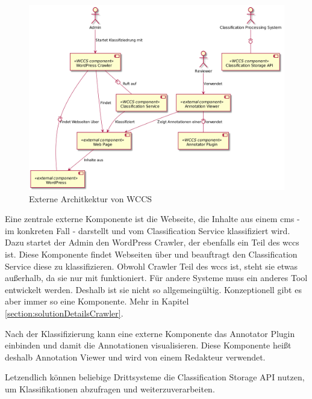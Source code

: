        \begin{figure}
            \centering
            \includegraphics[width=\textwidth]{../resources/architecture/external_architecture.png}
            \caption{Externe Architkektur von WCCS}
            \label{image:wccsExternalArchitecture}
        \end{figure}

        Eine zentrale externe Komponente ist die Webseite,
        die Inhalte aus einem \gls{cms} - im konkreten Fall {\wordpress} -
        darstellt und vom Classification Service klassifiziert wird.
        Dazu startet der Admin den WordPress Crawler, der ebenfalls ein Teil des \gls{wccs} ist.
        Diese Komponente findet Webseiten über {\wordpress} und beauftragt den
        Classification Service diese zu klassifizieren.
        Obwohl Crawler Teil des \gls{wccs} ist, steht sie etwas außerhalb,
        da sie nur mit {\wordpress} funktioniert. Für andere Systeme muss ein anderes Tool
        entwickelt werden. Deshalb ist sie nicht so allgemeingültig.
        Konzeptionell gibt es aber immer so eine Komponente.
        Mehr in Kapitel \ref{section:solutionDetailsCrawler}.

        Nach der Klassifizierung kann eine externe Komponente das Annotator Plugin
        einbinden und damit die Annotationen visualisieren.
        Diese Komponente heißt deshalb Annotation Viewer und wird von einem Redakteur
        verwendet.

        Letzendlich können beliebige Drittsysteme die Classification Storage API
        nutzen, um Klassifikationen abzufragen und weiterzuverarbeiten.
